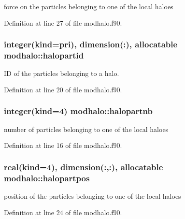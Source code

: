 force on the particles belonging to one of the local haloes 



Definition at line 27 of file modhalo.\+f90.

\subsubsection[{\texorpdfstring{halopartid}{halopartid}}]{\setlength{\rightskip}{0pt plus 5cm}integer(kind=pri), dimension(\+:), allocatable modhalo\+::halopartid}\hypertarget{namespacemodhalo_a6c47abc5102dc629247c7b90831b1030}{}\label{namespacemodhalo_a6c47abc5102dc629247c7b90831b1030}


ID of the particles belonging to a halo. 



Definition at line 20 of file modhalo.\+f90.

\subsubsection[{\texorpdfstring{halopartnb}{halopartnb}}]{\setlength{\rightskip}{0pt plus 5cm}integer(kind=4) modhalo\+::halopartnb}\hypertarget{namespacemodhalo_a026b99d5d7dc52fa2755b516c9947514}{}\label{namespacemodhalo_a026b99d5d7dc52fa2755b516c9947514}


number of particles belonging to one of the local haloes 



Definition at line 16 of file modhalo.\+f90.

\subsubsection[{\texorpdfstring{halopartpos}{halopartpos}}]{\setlength{\rightskip}{0pt plus 5cm}real(kind=4), dimension(\+:,\+:), allocatable modhalo\+::halopartpos}\hypertarget{namespacemodhalo_a935d49a97e72fe931ab0e2cee84d1523}{}\label{namespacemodhalo_a935d49a97e72fe931ab0e2cee84d1523}


position of the particles belonging to one of the local haloes 



Definition at line 24 of file modhalo.\+f90.

